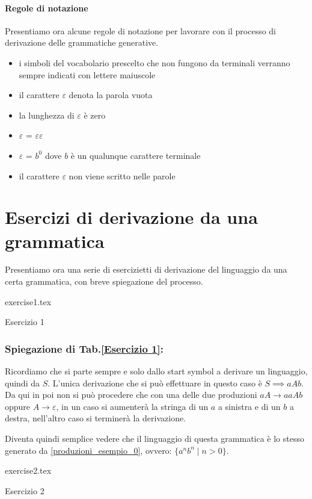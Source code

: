 \documentclass[class=book, crop=false, oneside, 12pt]{standalone}
\begin{document}
\paragraph{Regole di notazione}
Presentiamo ora alcune regole di notazione per lavorare con il processo di derivazione delle grammatiche generative.
\begin{itemize}
    \item i simboli del vocabolario prescelto che non fungono da terminali verranno sempre indicati con lettere maiuscole
    \item il carattere \(\varepsilon\) denota la parola vuota
    \item la lunghezza di \(\varepsilon\) è zero
    \item \(\varepsilon\) = \(\varepsilon\)\(\varepsilon\)
    \item \(\varepsilon\) =  \(b^0\) dove \(b\) è un qualunque carattere terminale
    \item il carattere \(\varepsilon\) non viene scritto nelle parole
\end{itemize}

\section{Esercizi di derivazione da una grammatica}
Presentiamo ora una serie di esercizietti di derivazione del linguaggio da una certa grammatica, con breve spiegazione del processo.
\begin{table}[H]
	\centering
	{exercise1.tex}
    \caption{Esercizio 1}
    \label{Esercizio 1}
\end{table}
\subsubsection*{Spiegazione di Tab.\ref{Esercizio 1}:}
Ricordiamo che si parte sempre e solo dallo start symbol a derivare un linguaggio, quindi da \(S\). L'unica derivazione che si può effettuare in questo caso è \(S \implies aAb\). Da qui in poi non si può procedere che con una delle due produzioni \(aA \to aaAb\) oppure \(A \to \varepsilon\), in un caso si aumenterà la stringa di un \(a\) a sinistra e di un \(b\) a destra, nell'altro caso si terminerà la derivazione.

Diventa quindi semplice vedere che il linguaggio di questa grammatica è lo stesso generato da \ref{produzioni_esempio_0}, ovvero: \(\{a^n b^n \mid n>0\}\).
\begin{table}[H]
	\centering
	{exercise2.tex}
    \caption{Esercizio 2}
    \label{Esercizio 2}
\end{table}
\end{document}

